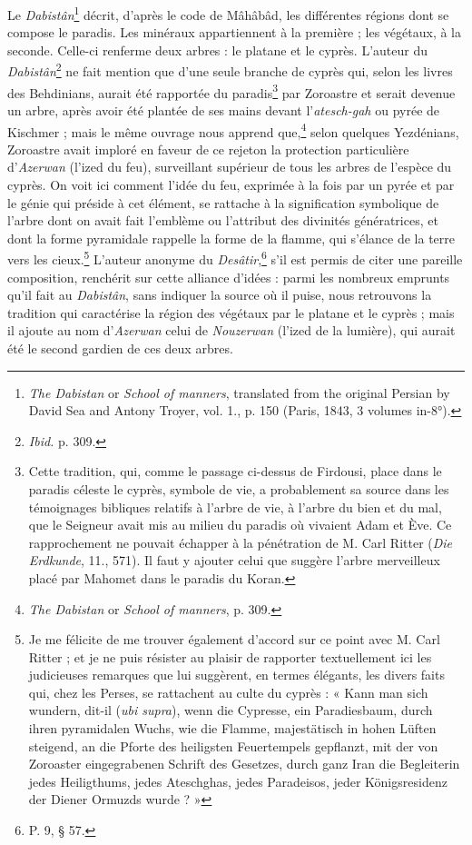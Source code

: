 \documentclass{article}
\begin{document}
Le \emph{Dabistân}\footnote{\emph{The Dabistan} or \emph{School of manners}, translated from the original Persian by David Sea and Antony Troyer, vol. 1., p. 150 (Paris, 1843, 3 volumes in-8°).} décrit, d'après le code de Mâhâbâd, les différentes régions dont se compose le paradis. Les minéraux appartiennent à la première ; les végétaux, à la seconde. Celle-ci renferme deux arbres : le platane et le cyprès. L'auteur du \emph{Dabistân}\footnote{\emph{Ibid.} p. 309.} ne fait mention que d'une seule branche de cyprès qui, selon les livres des Behdinians, aurait été rapportée du paradis\footnote{Cette tradition, qui, comme le passage ci-dessus de Firdousi, place dans le paradis céleste le cyprès, symbole de vie, a probablement sa source dans les témoignages bibliques relatifs à l'arbre de vie, à l'arbre du bien et du mal, que le Seigneur avait mis au milieu du paradis où vivaient Adam et Ève. Ce rapprochement ne pouvait échapper à la pénétration de M. Carl Ritter (\emph{Die Erdkunde}, 11., 571). Il faut y ajouter celui que suggère l'arbre merveilleux placé par Mahomet dans le paradis du Koran.} par Zoroastre et serait devenue un arbre, après avoir été plantée de ses mains devant l'\emph{atesch-gah} ou pyrée de Kischmer ; mais le même ouvrage nous apprend que,\footnote{\emph{The Dabistan} or \emph{School of manners}, p. 309.} selon quelques Yezdénians, Zoroastre avait imploré en faveur de ce rejeton la protection particulière d'\emph{Azerwan} (l'ized du feu), surveillant supérieur de tous les arbres de l'espèce du cyprès. On voit ici comment l'idée du feu, exprimée à la fois par un pyrée et par le génie qui préside à cet élément, se rattache à la signification symbolique de l'arbre dont on avait fait l'emblème ou l'attribut des divinités génératrices, et dont la forme pyramidale rappelle la forme de la flamme, qui s'élance de la terre vers les cieux.\footnote{Je me félicite de me trouver également d'accord sur ce point avec M. Carl Ritter ; et je ne puis résister au plaisir de rapporter textuellement ici les judicieuses remarques que lui suggèrent, en termes élégants, les divers faits qui, chez les Perses, se rattachent au culte du cyprès : « Kann man sich wundern, dit-il (\emph{ubi supra}), wenn die Cypresse, ein Paradiesbaum, durch ihren pyramidalen Wuchs, wie die Flamme, majestätisch in hohen Lüften steigend, an die Pforte des heiligsten Feuertempels gepflanzt, mit der von Zoroaster eingegrabenen Schrift des Gesetzes, durch ganz Iran die Begleiterin jedes Heiligthums, jedes Ateschghas, jedes Paradeisos, jeder Königsresidenz der Diener Ormuzds wurde ? »} L'auteur anonyme du \emph{Desâtir},\footnote{P. 9, § 57.} s'il est permis de citer une pareille composition, renchérit sur cette alliance d'idées : parmi les nombreux emprunts qu'il fait au \emph{Dabistân}, sans indiquer la source où il puise, nous retrouvons la tradition qui caractérise la région des végétaux par le platane et le cyprès ; mais il ajoute au nom d'\emph{Azerwan} celui de \emph{Nouzerwan} (l'ized de la lumière), qui aurait été le second gardien de ces deux arbres.
\end{document}
